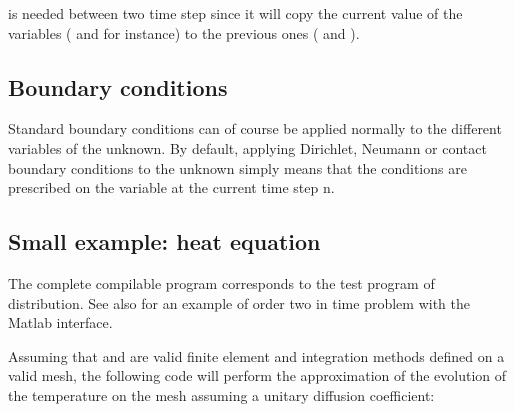 \documentclass[a4paper,11pt,english]{sphinxmanual}
\begin{document}
is needed between two time step since it will copy the current value of the variables ( and  for instance) to the previous ones ( and ).


\subsection{Boundary conditions}
\label{\detokenize{userdoc/model_time_integration:boundary-conditions}}
Standard boundary conditions can of course be applied normally to the different variables of the unknown. By default, applying Dirichlet, Neumann or contact boundary conditions to the unknown simply means that the conditions are prescribed on the variable at the current time step n.


\subsection{Small example: heat equation}
\label{\detokenize{userdoc/model_time_integration:small-example-heat-equation}}
The complete compilable program corresponds to the test program  of  distribution. See also  for an example of order two in time problem with the Matlab interface.

Assuming that  and  are valid finite element and integration methods defined on a valid mesh, the following code will perform the approximation of the evolution of the temperature on the mesh assuming a unitary diffusion coefficient:
\end{document}
